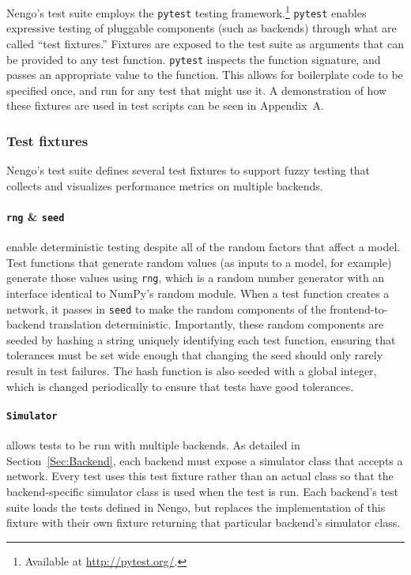 \documentclass{frontiersSCNS}
\begin{document}
Nengo's test suite employs the \texttt{pytest}
testing framework.\footnote{Available at \url{http://pytest.org/}.}
\texttt{pytest} enables
expressive testing of pluggable components
(such as backends)
through what are called ``test fixtures.''
Fixtures are exposed to the test suite
as arguments that can be provided
to any test function.
\texttt{pytest} inspects the function signature,
and passes an appropriate value
to the function.
This allows for boilerplate code
to be specified once,
and run for any test that might use it.
A demonstration of how these fixtures
are used in test scripts
can be seen in Appendix~A.

\subsubsection{Test fixtures}

Nengo's test suite defines several test fixtures
to support fuzzy testing
that collects and visualizes performance metrics
on multiple backends.

\paragraph{\texttt{rng} \& \texttt{seed}}
enable deterministic testing despite
all of the random factors that affect a model.
Test functions that generate random values
(as inputs to a model, for example)
generate those values using \texttt{rng},
which is a random number generator
with an interface identical to
NumPy's random module.
When a test function creates a network,
it passes in \texttt{seed} to make
the random components
of the frontend-to-backend translation deterministic.
Importantly, these random components
are seeded by hashing a string uniquely
identifying each test function,
ensuring that tolerances must be set
wide enough that changing the seed
should only rarely result in test failures.
The hash function is also seeded
with a global integer,
which is changed periodically to ensure
that tests have good tolerances.

\paragraph{\texttt{Simulator}}
allows tests to be run with multiple backends.
As detailed in Section~\ref{Sec:Backend},
each backend must expose a simulator class
that accepts a network.
Every test uses this test fixture rather than
an actual class so that
the backend-specific simulator class is used
when the test is run.
Each backend's test suite loads
the tests defined in Nengo,
but replaces the implementation of
this fixture with their own fixture
returning that particular backend's simulator class.
\end{document}
